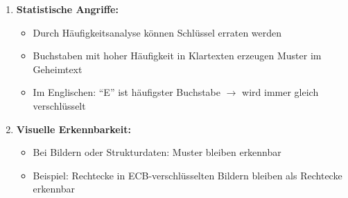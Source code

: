 \documentclass[12pt,a4paper]{article}
\begin{document}
\begin{tcolorbox}[colback=solutionbg, colframe=black!30]
\begin{enumerate}[1.]
    \item \textbf{Statistische Angriffe:}
    \begin{itemize}
        \item Durch Häufigkeitsanalyse können Schlüssel erraten werden
        \item Buchstaben mit hoher Häufigkeit in Klartexten erzeugen Muster im Geheimtext
        \item Im Englischen: ``E'' ist häufigster Buchstabe $\to$ wird immer gleich verschlüsselt
    \end{itemize}
    
    \item \textbf{Visuelle Erkennbarkeit:}
    \begin{itemize}
        \item Bei Bildern oder Strukturdaten: Muster bleiben erkennbar
        \item Beispiel: Rechtecke in ECB-verschlüsselten Bildern bleiben als Rechtecke erkennbar
    \end{itemize}
\end{enumerate}

\end{tcolorbox}
\end{document}
